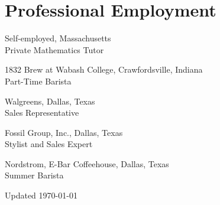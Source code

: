 \documentclass[11pt,letterpaper]{report} %
\newcommand{\listitemspace}{0.25em}
\renewenvironment{itemize}
{\begin{list}{}{\setlength{\leftmargin}{0em}
                \setlength{\parskip}{0em}
                \setlength{\itemsep}{\listitemspace}
                \setlength{\parsep}{\listitemspace}}}
{\end{list}}
\newcommand{\forthcoming}{\textit{Forthcoming.}}
\begin{document}

    \section*{Professional Employment}
    \begin{tablist}
        \item[2025--]   \tab{}Self-employed, Massachusetts \\
                              Private Mathematics Tutor
        \item[2025]     \tab{}1832 Brew at Wabash College, Crawfordsville, Indiana \\
                              Part-Time Barista
        \item[2024]     \tab{}Walgreens, Dallas, Texas \\
                              Sales Representative
        \item[2024]     \tab{}Fossil Group, Inc., Dallas, Texas \\
                              Stylist and Sales Expert
        \item[2023]     \tab{}Nordstrom, E-Bar Coffeehouse, Dallas, Texas \\
                              Summer Barista
    \end{tablist}

    \begin{center}
        \vfill
        Updated \monthyeardate\today
    \end{center}
\end{document}
